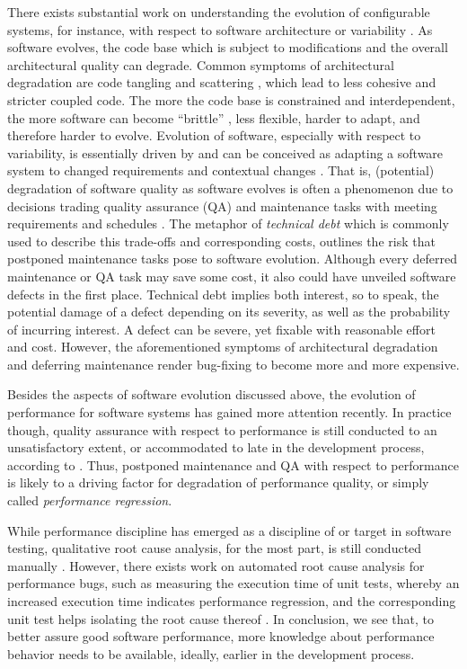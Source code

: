 There exists substantial work on understanding the evolution of configurable
systems, for instance, with respect to software architecture
\citep{zhang_variability_2013,passos_feature_2015} or variability
\citep{seidl_co-evolution_2012,peng_analyzing_2011,passos_towards_2012}. As
software evolves, the code base which is subject to modifications and the
overall architectural quality can degrade. Common symptoms of architectural
degradation are code tangling and scattering
\citep{zhang_variability_2013,passos_feature_2015}, which lead to less cohesive and stricter coupled code. 
The more the code base is constrained and interdependent, the more software can become ``brittle'' \citep{perry_software_1991}, less flexible, harder to adapt, and therefore harder to evolve.
Evolution of software, especially with respect to variability, is essentially
driven by and can be conceived as adapting a software system to changed
requirements and contextual changes \citep{peng_analyzing_2011}. That is,
(potential) degradation of software quality as software evolves is often a phenomenon due
to decisions trading quality assurance (QA) and maintenance tasks with meeting
requirements and schedules \citep{guo_tracking_2011}. The metaphor of
\emph{technical debt} \citep{guo_tracking_2011} which is commonly used to
describe this trade-offs and corresponding costs, outlines the risk that postponed maintenance tasks pose to
software evolution. Although every deferred maintenance or QA task may save
some cost, it also could have unveiled software defects
in the first place. Technical debt implies both interest, so to speak, the
potential damage of a defect depending on its severity, as well as the
probability of incurring interest. A defect can be severe, yet fixable with
reasonable effort and cost. However, the aforementioned symptoms of
architectural degradation and deferring maintenance render bug-fixing to become
more and more expensive.

Besides the aspects of software evolution discussed above, the evolution of
performance for software systems has gained more attention recently. In
practice though, quality assurance with respect to performance is still
conducted to an unsatisfactory extent, or accommodated to late in the
development process, according to \cite{molyneaux_art_2014}. Thus, postponed
maintenance and QA with respect to performance is likely to a driving factor for
degradation of performance quality, or simply called \emph{performance regression}.

While performance discipline has emerged as a discipline of or target
in software testing, qualitative root cause analysis, for the most part, is
still conducted manually \citep{molyneaux_art_2014}. However, there exists work
on automated root cause analysis for performance bugs, such as measuring the execution time
of unit tests, whereby an increased execution time indicates performance
regression, and the corresponding unit test helps isolating the root cause
thereof \citep{heger_automated_2013,nguyen_industrial_2014}. In conclusion, we
see that, to better assure good software performance, more knowledge about performance behavior needs to be
available, ideally, earlier in the development process.

